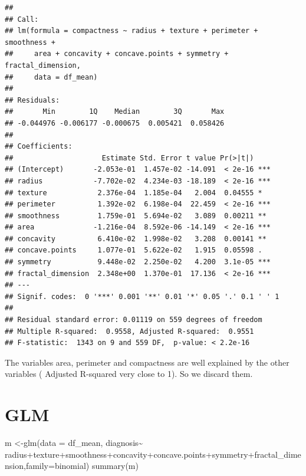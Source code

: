 \documentclass[
  11pt,
]{article}
\newenvironment{Shaded}{\begin{snugshade}}{\end{snugshade}}
\newcommand{\AttributeTok}[1]{\textcolor[rgb]{0.77,0.63,0.00}{#1}}
\newcommand{\FunctionTok}[1]{\textcolor[rgb]{0.00,0.00,0.00}{#1}}
\newcommand{\NormalTok}[1]{#1}
\newcommand{\OtherTok}[1]{\textcolor[rgb]{0.56,0.35,0.01}{#1}}
\newcommand{\SpecialCharTok}[1]{\textcolor[rgb]{0.00,0.00,0.00}{#1}}
\begin{document}
\begin{verbatim}
## 
## Call:
## lm(formula = compactness ~ radius + texture + perimeter + smoothness + 
##     area + concavity + concave.points + symmetry + fractal_dimension, 
##     data = df_mean)
## 
## Residuals:
##       Min        1Q    Median        3Q       Max 
## -0.044976 -0.006177 -0.000675  0.005421  0.058426 
## 
## Coefficients:
##                     Estimate Std. Error t value Pr(>|t|)    
## (Intercept)       -2.053e-01  1.457e-02 -14.091  < 2e-16 ***
## radius            -7.702e-02  4.234e-03 -18.189  < 2e-16 ***
## texture            2.376e-04  1.185e-04   2.004  0.04555 *  
## perimeter          1.392e-02  6.198e-04  22.459  < 2e-16 ***
## smoothness         1.759e-01  5.694e-02   3.089  0.00211 ** 
## area              -1.216e-04  8.592e-06 -14.149  < 2e-16 ***
## concavity          6.410e-02  1.998e-02   3.208  0.00141 ** 
## concave.points     1.077e-01  5.622e-02   1.915  0.05598 .  
## symmetry           9.448e-02  2.250e-02   4.200  3.1e-05 ***
## fractal_dimension  2.348e+00  1.370e-01  17.136  < 2e-16 ***
## ---
## Signif. codes:  0 '***' 0.001 '**' 0.01 '*' 0.05 '.' 0.1 ' ' 1
## 
## Residual standard error: 0.01119 on 559 degrees of freedom
## Multiple R-squared:  0.9558, Adjusted R-squared:  0.9551 
## F-statistic:  1343 on 9 and 559 DF,  p-value: < 2.2e-16
\end{verbatim}

The variables area, perimeter and compactness are well explained by the
other variables ( Adjusted R-squared very close to 1). So we discard
them.

\hypertarget{glm}{%
\section{GLM}\label{glm}}

\begin{Shaded}
\begin{Highlighting}[]
\NormalTok{m }\OtherTok{\textless{}{-}}\FunctionTok{glm}\NormalTok{(}\AttributeTok{data =}\NormalTok{ df\_mean, diagnosis}\SpecialCharTok{\textasciitilde{}}\NormalTok{ radius}\SpecialCharTok{+}\NormalTok{texture}\SpecialCharTok{+}\NormalTok{smoothness}\SpecialCharTok{+}\NormalTok{concavity}\SpecialCharTok{+}\NormalTok{concave.points}\SpecialCharTok{+}\NormalTok{symmetry}\SpecialCharTok{+}\NormalTok{fractal\_dimension,}\AttributeTok{family=}\NormalTok{binomial)}
\FunctionTok{summary}\NormalTok{(m)}
\end{Highlighting}
\end{Shaded}
\end{document}

